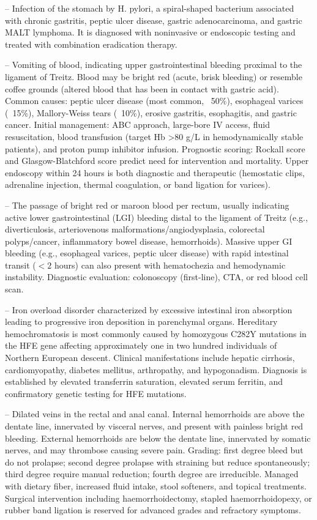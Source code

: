 -- Infection of the stomach by H. pylori, a spiral-shaped bacterium associated with chronic gastritis, peptic ulcer disease, gastric adenocarcinoma, and gastric MALT lymphoma. It is diagnosed with noninvasive or endoscopic testing and treated with combination eradication therapy.

-- Vomiting of blood, indicating upper gastrointestinal bleeding proximal to the ligament of Treitz. Blood may be bright red (acute, brisk bleeding) or resemble coffee grounds (altered blood that has been in contact with gastric acid). Common causes: peptic ulcer disease (most common, ~50\%), esophageal varices (~15\%), Mallory-Weiss tears (~10\%), erosive gastritis, esophagitis, and gastric cancer. Initial management: ABC approach, large-bore IV access, fluid resuscitation, blood transfusion (target Hb >80 g/L in hemodynamically stable patients), and proton pump inhibitor infusion. Prognostic scoring: Rockall score and Glasgow-Blatchford score predict need for intervention and mortality. Upper endoscopy within 24 hours is both diagnostic and therapeutic (hemostatic clips, adrenaline injection, thermal coagulation, or band ligation for varices).

-- The passage of bright red or maroon blood per rectum, usually indicating active lower gastrointestinal (LGI) bleeding distal to the ligament of Treitz (e.g., diverticulosis, arteriovenous malformations/angiodysplasia, colorectal polyps/cancer, inflammatory bowel disease, hemorrhoids). Massive upper GI bleeding (e.g., esophageal varices, peptic ulcer disease) with rapid intestinal transit ($<2$ hours) can also present with hematochezia and hemodynamic instability. Diagnostic evaluation: colonoscopy (first-line), CTA, or red blood cell scan.

-- Iron overload disorder characterized by excessive intestinal iron absorption leading to progressive iron deposition in parenchymal organs. Hereditary hemochromatosis is most commonly caused by homozygous C282Y mutations in the HFE gene affecting approximately one in two hundred individuals of Northern European descent. Clinical manifestations include hepatic cirrhosis, cardiomyopathy, diabetes mellitus, arthropathy, and hypogonadism. Diagnosis is established by elevated transferrin saturation, elevated serum ferritin, and confirmatory genetic testing for HFE mutations.

-- Dilated veins in the rectal and anal canal. Internal hemorrhoids are above the dentate line, innervated by visceral nerves, and present with painless bright red bleeding. External hemorrhoids are below the dentate line, innervated by somatic nerves, and may thrombose causing severe pain. Grading: first degree bleed but do not prolapse; second degree prolapse with straining but reduce spontaneously; third degree require manual reduction; fourth degree are irreducible. Managed with dietary fiber, increased fluid intake, stool softeners, and topical treatments. Surgical intervention including haemorrhoidectomy, stapled haemorrhoidopexy, or rubber band ligation is reserved for advanced grades and refractory symptoms.

